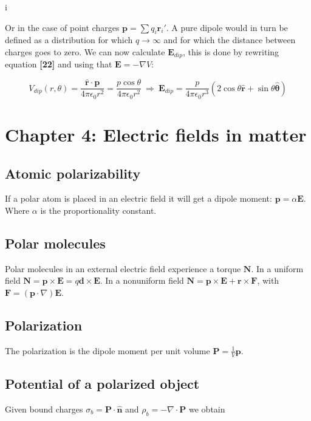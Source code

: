 i\documentclass[a4paper]{article}
\begin{document}
Or in the case of point charges $\bm{p}=\sum q_i \bm{r}_i'$. A pure dipole would in turn be defined as a distribution for which $q\rightarrow \infty$ and for which the distance between charges goes to zero. We can now calculate $\bm{E}_{dip}$, this is done by rewriting equation \textbf{[22]} and using that $\bm{E}=-\nabla V$:

\begin{equation}
    V_{dip}(r, \theta)=\frac{\hat{\bm{r}}\cdot\bm{p}}{4\pi\epsilon_0 r^2}=\frac{p\cos\theta}{4\pi\epsilon_0 r^2}\ \Rightarrow\ \bm{E}_{dip}=\frac{p}{4\pi\epsilon_0 r^3}(2\cos\theta\hat{\bm{r}}+\sin\theta\hat{\bm{\theta}})
\end{equation}

\section{Chapter 4: Electric fields in matter}

\subsection{Atomic polarizability}

If a polar atom is placed in an electric field it will get a dipole moment: $\bm{p}=\alpha\bm{E}$. Where $\alpha$ is the proportionality constant.

\subsection{Polar molecules}

Polar molecules in an external electric field experience a torque $\bm{N}$. In a uniform field $\bm{N}=\bm{p}\times\bm{E}=q\bm{d}\times\bm{E}$. In a nonuniform field $\bm{N}=\bm{p}\times\bm{E}+\bm{r}\times\bm{F}$, with $\bm{F}=(\bm{p}\cdot\nabla)\bm{E}$.

\subsection{Polarization}

The polarization is the dipole moment per unit volume $\bm{P}=\frac{1}{V}\bm{p}$.

\subsection{Potential of a polarized object}

Given bound charges $\sigma_b=\bm{P}\cdot\bm{\hat{n}}$ and $\rho_b=-\nabla\cdot\bm{P}$ we obtain
\end{document}
